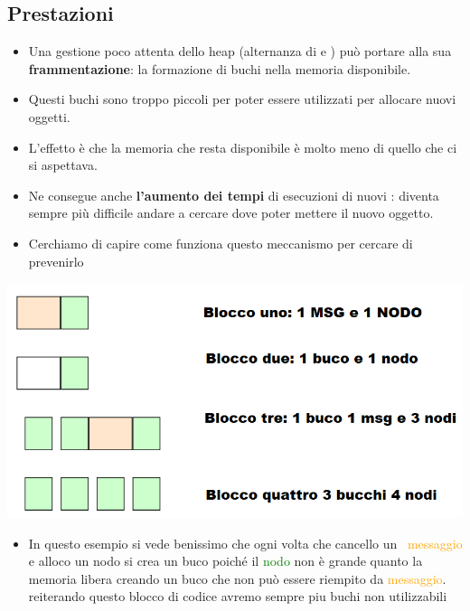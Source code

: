 \subsection{Prestazioni}
\begin{itemize}
    \item Una gestione poco attenta dello heap (alternanza di  e
    ) può portare alla sua \textbf{frammentazione}: la
    formazione di buchi nella memoria disponibile.
    \item Questi buchi sono troppo piccoli per poter essere utilizzati
    per allocare nuovi oggetti.
    \item L’effetto è che la memoria che resta disponibile è molto
    meno di quello che ci si aspettava.
    \item Ne consegue anche \textbf{l’aumento dei tempi} di esecuzioni di
    nuovi : diventa sempre più difficile andare a cercare
    dove poter mettere il nuovo oggetto.
    \item Cerchiamo di capire come funziona questo meccanismo
    per cercare di prevenirlo
\end{itemize}
\begin{tcolorbox}[width=15cm, boxsep=10pt]
    
    
\end{tcolorbox}
\includegraphics[scale = 0.4]{Capitoli/Allocazione Memoria/Esempi/Blocchi.png}\newline
\begin{itemize}
    \item In questo esempio si vede benissimo che ogni volta che cancello un \  \newline\textcolor{orange}{messaggio} e alloco un nodo si crea un buco poiché il \textcolor{green}{nodo} non è grande quanto la memoria libera creando un buco che non può essere riempito da \newline\textcolor{orange}{messaggio}. reiterando questo blocco di codice avremo sempre piu buchi non utilizzabili
\end{itemize}

